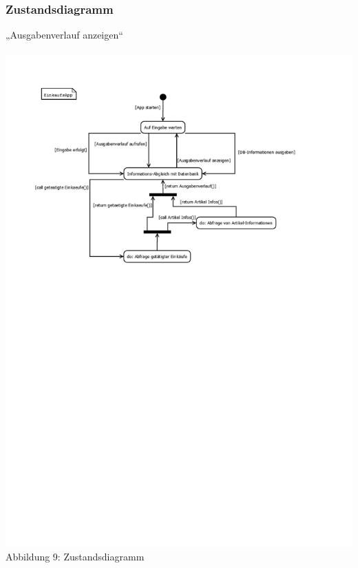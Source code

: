 \documentclass[12pt,a4paper]{article}
\begin{document}
\subsubsection*{Zustandsdiagramm}
 „Ausgabenverlauf anzeigen“
\\
\\
\hspace*{-10mm} 
\includegraphics[trim = 17mm 130mm 0mm 20mm,clip]{Zustand.pdf}
\footnotesize Abbildung 9: Zustandsdiagramm
\normalsize
\end{document}
